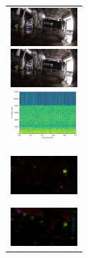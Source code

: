 \begin{figure}[htbp]
\begin{tabular}{l}
\begin{minipage}{0.165\hsize}
\begin{center}
        \end{center}
      \end{minipage}
      \begin{minipage}{0.165\hsize}
        \begin{center}
          \includegraphics[clip, width=2.5cm]{./Figures/still_stop2-4.eps}
        \end{center}
      \end{minipage}
      \begin{minipage}{0.165\hsize}
        \begin{center}
          \includegraphics[clip, width=2.5cm]{./Figures/still_stop2-5.eps}
        \end{center}
      \end{minipage}
      \begin{minipage}{0.165\hsize}
        \begin{center}
          \includegraphics[clip, width=2.5cm]{./Figures/sound_stop2.eps}
        \end{center}
      \end{minipage}
\\  %
      \begin{minipage}{0.165\hsize}
        \begin{center}
          \includegraphics[clip, width=2.5cm]{./Figures/optic_stop2-1.eps}
          \hspace{0.3cm} { }
        \end{center}
      \end{minipage}
      \begin{minipage}{0.165\hsize}
        \begin{center}
          \includegraphics[clip, width=2.5cm]{./Figures/optic_stop2-2.eps}

\end{center}
\end{minipage}
\end{tabular}
\end{figure}
